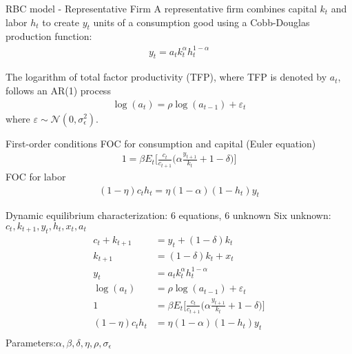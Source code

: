 \documentclass[aspectratio=169]{beamer} %
\begin{document}
\begin{frame}{RBC model - Representative Firm}
    A representative firm combines capital $k_t$ and labor $h_t$ to create $y_t$ units of a consumption good using a Cobb-Douglas production function: 
    \begin{align*}
        y_t = a_t k_t^{\alpha} h_t^{1-\alpha}\tag{3}
    \end{align*}

The logarithm of total factor productivity (TFP), where TFP is denoted by $a_t$, follows an AR(1) process
\begin{align*}
    \log(a_t) = \rho  \log(a_{t-1}) + \varepsilon_t\tag{4}
\end{align*}
where $\varepsilon\sim\mathcal{N}(0,\sigma_\epsilon^2)$.
\end{frame}
\begin{frame}{First-order conditions}
FOC for consumption and capital (Euler equation)
\begin{align*}
    1 = \beta E_t \Big[ \frac{c_t}{c_{t+1}}\big(\alpha \frac{y_{t+1}}{k_t} + 1 -\delta \big) \Big]\tag{5}
\end{align*}
FOC for labor
\begin{align*}
    (1-\eta) c_t h_t = \eta(1- \alpha)(1 - h_t) y_t \tag{6}
\end{align*}
    
\end{frame}

\begin{frame}{Dynamic equilibrium characterization: 6 equations, 6 unknown}
Six unknown: $c_t, k_{t+1}, y_t, h_t, x_t, a_t$
\begin{align*}
     c_t + k_{t+1} &= y_t + (1 - \delta)k_{t}\tag{Budget Constr.}\\
    k_{t+1} &= (1-\delta)k_t + x_t\tag{Capital LoM}\\
     y_t &= a_t k_t^{\alpha} h_t^{1-\alpha}\tag{Production}\\
     \log(a_t) &= \rho  \log(a_{t-1}) + \varepsilon_t\tag{Exog. TFP}\\
     1 &= \beta E_t \Big[ \frac{c_t}{c_{t+1}}\big(\alpha \frac{y_{t+1}}{k_t} + 1 -\delta \big) \Big]\tag{Euler eq.}\\
     (1-\eta) c_t h_t &= \eta(1- \alpha)(1 - h_t) y_t \tag{Labor foc}\\
\end{align*}
Parameters:$\alpha, \beta, \delta, \eta, \rho,\sigma_\epsilon$
\end{frame}
\end{document}
